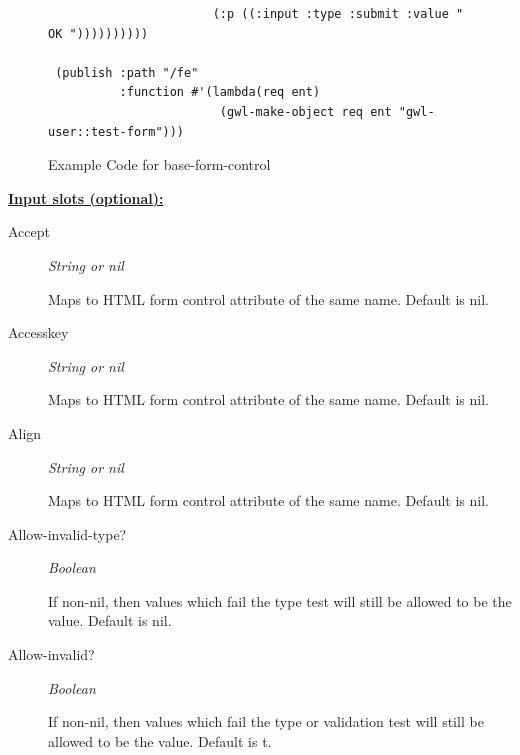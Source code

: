 \documentclass [11pt]{book}
\begin{document}
\begin{itemize}
\begin{figure}
\begin{lrbox}{\boxedverb}
\begin{minipage}{\linewidth}
{\begin{verbatim}
                       (:p ((:input :type :submit :value " OK "))))))))))
 
 (publish :path "/fe"
          :function #'(lambda(req ent)
                        (gwl-make-object req ent "gwl-user::test-form")))

\end{verbatim}}
\end{minipage}
\end{lrbox}
\fbox{\usebox{\boxedverb}}

\caption{Example Code for base-form-control}

\label{fig:example-code-base-form-control}

\end{figure}





\textbf{
\underline{Input slots (optional):}}

\begin{description}

\item [Accept]
\emph{String or nil}

 Maps to HTML form control attribute of the same name. Default is nil.




\item [Accesskey]
\emph{String or nil}

 Maps to HTML form control attribute of the same name. Default is nil.




\item [Align]
\emph{String or nil}

 Maps to HTML form control attribute of the same name. Default is nil.




\item [Allow-invalid-type?]
\emph{Boolean}

 If non-nil, then values which fail the type test will still be allowed to be the value. Default is nil.




\item [Allow-invalid?]
\emph{Boolean}

 If non-nil, then values which fail the type or validation test will still be allowed to be the value. Default is t.





\end{description}
\end{itemize}
\end{document}
